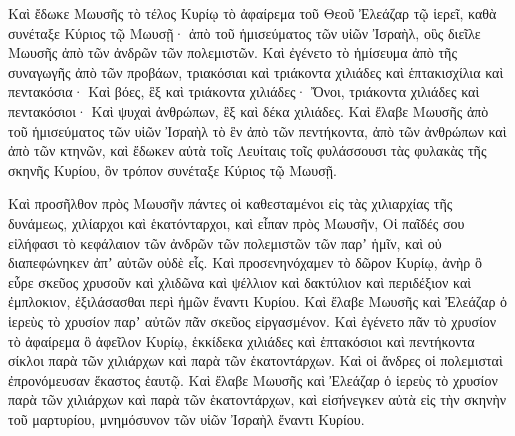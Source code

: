 {\par }{\PP {}Καὶ ἔδωκε Μωυσῆς τὸ τέλος Κυρίῳ τὸ ἀφαίρεμα τοῦ Θεοῦ Ἐλεάζαρ τῷ ἱερεῖ, καθὰ συνέταξε Κύριος τῷ Μωυσῇ·
ἀπὸ τοῦ ἡμισεύματος τῶν υἱῶν Ἰσραὴλ, οὓς διεῖλε Μωυσῆς ἀπὸ τῶν ἀνδρῶν τῶν πολεμιστῶν.
Καὶ ἐγένετο τὸ ἡμίσευμα ἀπὸ τῆς συναγωγῆς ἀπὸ τῶν προβάων, τριακόσιαι καὶ τριάκοντα χιλιάδες καὶ ἑπτακισχίλια καὶ πεντακόσια·
Καὶ βόες, ἓξ καὶ τριάκοντα χιλιάδες·
Ὄνοι, τριάκοντα χιλιάδες καὶ πεντακόσιοι·
Καὶ ψυχαὶ ἀνθρώπων, ἓξ καὶ δέκα χιλιάδες.
Καὶ ἔλαβε Μωυσῆς ἀπὸ τοῦ ἡμισεύματος τῶν υἱῶν Ἰσραὴλ τὸ ἓν ἀπὸ τῶν πεντήκοντα, ἀπὸ τῶν ἀνθρώπων καὶ ἀπὸ τῶν κτηνῶν, καὶ ἔδωκεν αὐτὰ τοῖς Λευίταις τοῖς φυλάσσουσι τὰς φυλακὰς τῆς σκηνῆς Κυρίου, ὃν τρόπον συνέταξε Κύριος τῷ Μωυσῇ.
\par }{\PP {}Καὶ προσῆλθον πρὸς Μωυσῆν πάντες οἱ καθεσταμένοι εἰς τὰς χιλιαρχίας τῆς δυνάμεως, χιλίαρχοι καὶ ἑκατόνταρχοι,
καὶ εἶπαν πρὸς Μωυσῆν, Οἱ παῖδές σου εἰλήφασι τὸ κεφάλαιον τῶν ἀνδρῶν τῶν πολεμιστῶν τῶν παρʼ ἡμῖν, καὶ οὐ διαπεφώνηκεν ἀπʼ αὐτῶν οὐδὲ εἷς.
Καὶ προσενηνόχαμεν τὸ δῶρον Κυρίῳ, ἀνὴρ ὃ εὗρε σκεῦος χρυσοῦν καὶ χλιδῶνα καὶ ψέλλιον καὶ δακτύλιον καὶ περιδέξιον καὶ ἐμπλοκιον, ἐξιλάσασθαι περὶ ἡμῶν ἔναντι Κυρίου.
Καὶ ἔλαβε Μωυσῆς καὶ Ἐλεάζαρ ὁ ἱερεὺς τὸ χρυσίον παρʼ αὐτῶν πᾶν σκεῦος εἰργασμένον.
Καὶ ἐγένετο πᾶν τὸ χρυσίον τὸ ἀφαίρεμα ὃ ἀφεῖλον Κυρίῳ, ἑκκίδεκα χιλιάδες καὶ ἑπτακόσιοι καὶ πεντήκοντα σίκλοι παρὰ τῶν χιλιάρχων καὶ παρὰ τῶν ἑκατοντάρχων.
Καὶ οἱ ἄνδρες οἱ πολεμισταὶ ἐπρονόμευσαν ἕκαστος ἑαυτῷ.
Καὶ ἔλαβε Μωυσῆς καὶ Ἐλεάζαρ ὁ ἱερεὺς τὸ χρυσίον παρὰ τῶν χιλιάρχων καὶ παρὰ τῶν ἑκατοντάρχων, καὶ εἰσήνεγκεν αὐτὰ εἰς τὴν σκηνὴν τοῦ μαρτυρίου, μνημόσυνον τῶν υἱῶν Ἰσραὴλ ἔναντι Κυρίου.

}
